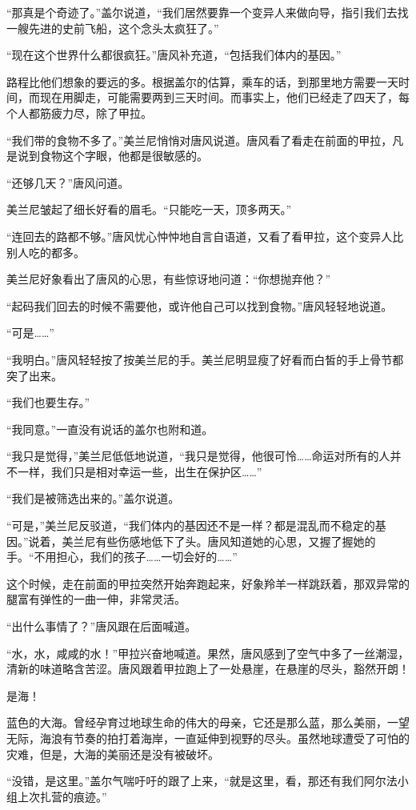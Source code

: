 “那真是个奇迹了。”盖尔说道，“我们居然要靠一个变异人来做向导，指引我们去找一艘先进的史前飞船，这个念头太疯狂了。”

“现在这个世界什么都很疯狂。”唐风补充道，“包括我们体内的基因。”

路程比他们想象的要远的多。根据盖尔的估算，乘车的话，到那里地方需要一天时间，而现在用脚走，可能需要两到三天时间。而事实上，他们已经走了四天了，每个人都筋疲力尽，除了甲拉。

“我们带的食物不多了。”美兰尼悄悄对唐风说道。唐风看了看走在前面的甲拉，凡是说到食物这个字眼，他都是很敏感的。

“还够几天？”唐风问道。

美兰尼皱起了细长好看的眉毛。“只能吃一天，顶多两天。”

“连回去的路都不够。”唐风忧心忡忡地自言自语道，又看了看甲拉，这个变异人比别人吃的都多。

美兰尼好象看出了唐风的心思，有些惊讶地问道：“你想抛弃他？”

“起码我们回去的时候不需要他，或许他自己可以找到食物。”唐风轻轻地说道。

“可是……”

“我明白。”唐风轻轻按了按美兰尼的手。美兰尼明显瘦了好看而白皙的手上骨节都突了出来。

“我们也要生存。”

“我同意。”一直没有说话的盖尔也附和道。

“我只是觉得，”美兰尼低低地说道，“我只是觉得，他很可怜……命运对所有的人并不一样，我们只是相对幸运一些，出生在保护区……”

“我们是被筛选出来的。”盖尔说道。

“可是，”美兰尼反驳道，“我们体内的基因还不是一样？都是混乱而不稳定的基因。”说着，美兰尼有些伤感地低下了头。唐风知道她的心思，又握了握她的手。“不用担心，我们的孩子……一切会好的……”

这个时候，走在前面的甲拉突然开始奔跑起来，好象羚羊一样跳跃着，那双异常的腿富有弹性的一曲一伸，非常灵活。

“出什么事情了？”唐风跟在后面喊道。

“水，水，咸咸的水！”甲拉兴奋地喊道。果然，唐风感到了空气中多了一丝潮湿，清新的味道略含苦涩。唐风跟着甲拉跑上了一处悬崖，在悬崖的尽头，豁然开朗！

是海！

蓝色的大海。曾经孕育过地球生命的伟大的母亲，它还是那么蓝，那么美丽，一望无际，海浪有节奏的拍打着海岸，一直延伸到视野的尽头。虽然地球遭受了可怕的灾难，但是，大海的美丽还是没有被破坏。

“没错，是这里。”盖尔气喘吁吁的跟了上来，“就是这里，看，那还有我们阿尔法小组上次扎营的痕迹。”


